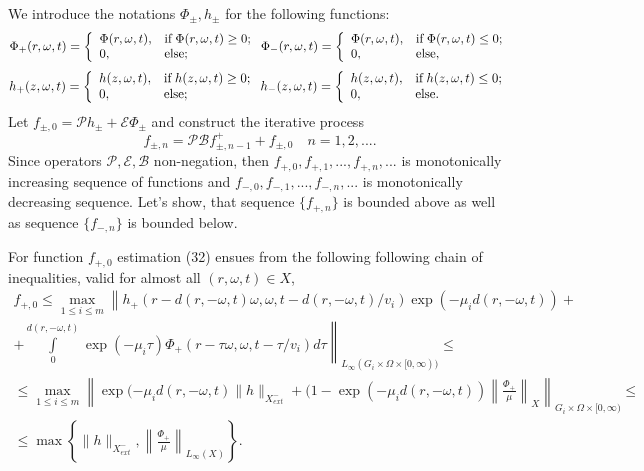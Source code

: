 \documentclass[12pt,reqno]{report}
\begin{document}
We introduce the notations $\Phi_{\pm},h_{\pm}$ for the following functions:
$$
\Phi_{+}(r,\omega,t)=\left\{%
\begin{array}{ll}
\Phi(r,\omega,t), & \hbox{if}\; \Phi(r,\omega,t)\geq 0;\\
0, & \hbox{else;} \\
\end{array}%
\right.
\Phi_{-}(r,\omega,t)=\left\{%
\begin{array}{ll}
\Phi(r,\omega,t), & \hbox{if} \;\Phi(r,\omega,t)\leq 0; \\
0, & \hbox{else,} \\
\end{array}%
\right.
$$
$$
h_{+}(z,\omega,t)=\left\{%
\begin{array}{ll}
h(z,\omega,t), & \hbox{if}\; h(z,\omega,t)\geq 0;\\
0, & \hbox{else;} \\
\end{array}%
\right.
h_{-}(z,\omega,t)=\left\{%
\begin{array}{ll}
h(z,\omega,t), & \hbox{if} \;h(z,\omega,t)\leq 0; \\
0, & \hbox{else.} \\
\end{array}%
\right.
$$
Let $f_{\pm,0}={\mathcal P} h_{\pm} + {\mathcal E}
\Phi_{\pm}$ and construct the iterative process
\begin{equation}
f_{\pm,n}= \mathcal P \mathcal B f^+_{\pm,n-1} + f_{\pm,0} \quad
n=1,2,....
\end{equation}
Since operators $\mathcal P,\mathcal E, \mathcal B$
non-negation, then $f_{+,0}, f_{+,1},..., f_{+,n},...$ is 
monotonically increasing sequence of functions and $f_{-,0},
f_{-,1},..., f_{-,n},...$ is monotonically decreasing sequence. 
Let's show, that sequence $\{f_{+,n} \}$ is bounded above as well as
sequence $\{f_{-,n} \}$ is bounded below.

For function $f_{+,0}$ estimation (32) ensues from the following following chain of inequalities, 
valid for almost all $(r,\omega,t)\in X$,
\begin{multline}
f_{+,0} \leq \max \limits_{1\leq i \leq m} \left \|
h_{+}(r-d(r,-\omega,t)\omega,\omega,t-d(r,-\omega,t)/v_i) \exp \left(-
\mu_i d(r,-\omega,t)\right) + \right.
\\
\left. +
\int \limits_0^{d(r,-\omega,t)} \exp \left(- \mu_i \tau
\right)
\Phi_+(r-\tau\omega,\omega,t-\tau/v_i) d\tau \right \|_{L_{\infty}(G_i \times \Omega \times [0,\infty))}
\leq \\
\leq \max \limits_{1\leq i \leq m} \left \| \exp (- \mu_i
d(r,-\omega,t) \|h\|_{X^-_{ext}} + (1- \exp (- \mu_i
d(r,-\omega,t)) \left\|\frac{\Phi_+}{\mu} \right\|_{X}
\right\|_{G_i \times \Omega \times [0,\infty)} \leq \\ \leq \max
\left\{\|h\|_{X^-_{ext}}, \left\|\frac{\Phi_+}{\mu} \right\|_{L_{\infty}(X)}
\right\}.
\end{multline}
\end{document}
